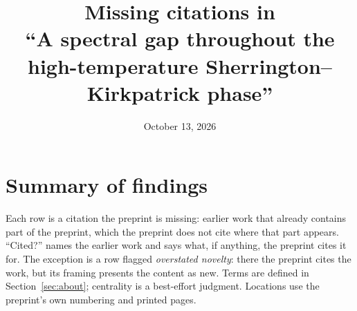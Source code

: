 \documentclass[11pt]{article}
\title{Missing citations in\\ ``A spectral gap throughout the high-temperature Sherrington--Kirkpatrick phase''}
\date{October 13, 2026}
\newcounter{finding}
\begin{document}
\maketitle

\section*{Summary of findings}

Each row is a citation the preprint is missing: earlier work that already
contains part of the preprint, which the preprint does not cite where that
part appears. ``Cited?'' names the earlier work and says what, if anything, the
preprint cites it for. The exception is a row flagged \emph{overstated
novelty}: there the preprint cites the work, but its framing presents the
content as new. Terms are defined in Section~\ref{sec:about}; centrality is a
best-effort judgment. Locations use the preprint's own numbering and printed
pages.
\end{document}
